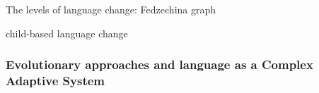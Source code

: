 


The levels of language change: Fedzechina graph

child-based language change~\citep[p.109]{Croft2006}

\subsubsection{Evolutionary approaches and language as a Complex Adaptive System}

